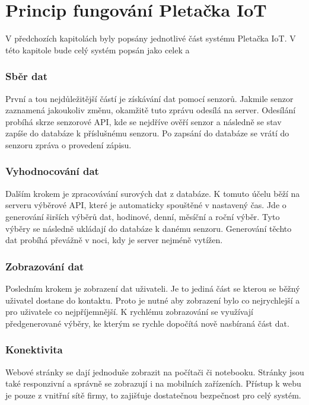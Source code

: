 \chapter{Princip fungování Pletačka IoT}
V předchozích kapitolách byly popsány jednotlivé část systému Pletačka IoT.
V této kapitole bude celý systém popsán jako celek a 


\subsection{Sběr dat}
První a tou nejdůležitější částí je získávání dat pomocí senzorů.
Jakmile senzor zaznamená jakoukoliv změnu, okamžitě tuto zprávu odesílá na server.
Odesílání probíhá skrze senzorové API, kde se nejdříve ověří senzor a následně se stav zapíše do databáze k příslušnému senzoru.
Po zapsání do databáze se vrátí do senzoru zpráva o provedení zápisu. 


\subsection{Vyhodnocování dat}
Dalším krokem je zpracovávání surových dat z databáze.
K tomuto účelu běží na serveru výběrové API, které je automaticky spouštěné v nastavený čas.
Jde o generování širších výběrů dat, hodinové, denní, měsíční a roční výběr.
Tyto výběry se následně ukládají do databáze k danému senzoru.
Generování těchto dat probíhá převážně v noci, kdy je server nejméně vytížen.


\subsection{Zobrazování dat}
Posledním krokem je zobrazení dat uživateli.
Je to jediná část se kterou se běžný uživatel dostane do kontaktu.
Proto je nutné aby zobrazení bylo co nejrychlejší a pro uživatele co nejpříjemnější.
K rychlému zobrazování se využívají předgenerované výběry, ke kterým se rychle dopočítá nově nasbíraná část dat.

\fxnote[author=JA]{\textcolor{mygreen}{schéma sběr - vyhodnocení - zobrazení}}

\subsection{Konektivita}
Webové stránky se dají jednoduše zobrazit na počítači či notebooku.
Stránky jsou také responzivní a správně se zobrazují i na mobilních zařízeních.
Přístup k webu je pouze z vnitřní sítě firmy, to zajišťuje dostatečnou bezpečnost pro celý systém.


\newpage